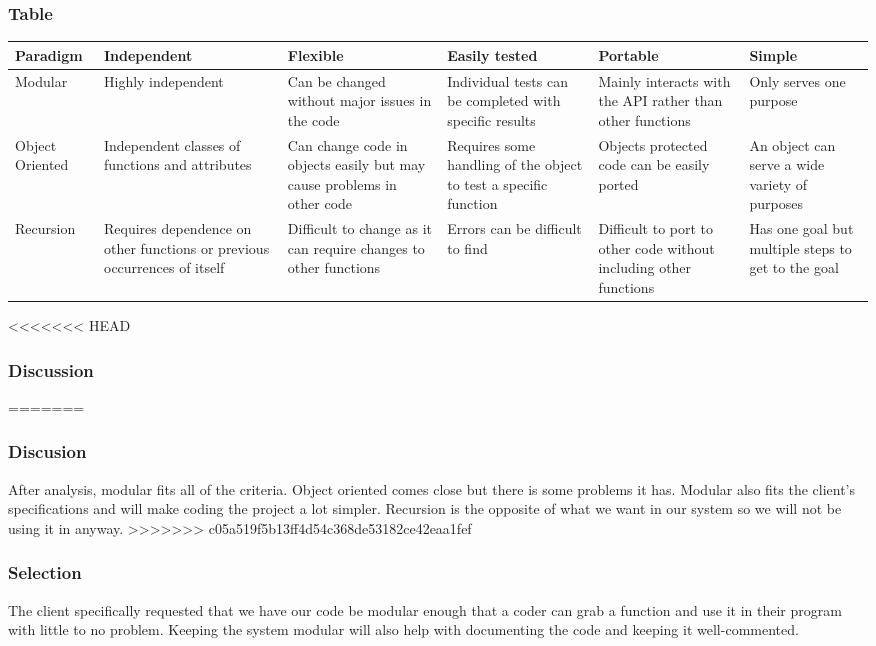 \documentclass[10pt,letterpaper,onecolumn,draftclsnofoot]{IEEEtran}
\begin{document}
\subsubsection{Table}
\begin{center}
\begin{tabular}{ ||B|M|M|M|M|M|| } 
\hline
Paradigm & Independent & Flexible & Easily tested & Portable & Simple \\
 \hline
 Modular & Highly independent & Can be changed without major issues in the code & Individual tests can be completed with specific results & Mainly interacts with the API rather than other functions & Only serves one purpose\\ 
 \hline
 Object Oriented & Independent classes of functions and attributes & Can change code in objects easily but may cause problems in other code & Requires some handling of the object to test a specific function & Objects protected code can be easily ported & An object can serve a wide variety of purposes\\ 
 \hline
 Recursion & Requires dependence on other functions or previous occurrences of itself & Difficult to change as it can require changes to other functions & Errors can be difficult to find  & Difficult to port to other code without including other functions & Has one goal but multiple steps to get to the goal\\ 
 \hline
\end{tabular}
\end{center}

<<<<<<< HEAD
\subsubsection{Discussion}
=======
\subsubsection{Discusion}
After analysis, modular fits all of the criteria. Object oriented comes close but there is some problems it has. Modular also fits the client's specifications and will make coding the project a lot simpler. Recursion is the opposite of what we want in our system so we will not be using it in anyway.
>>>>>>> c05a519f5b13ff4d54c368de53182ce42eaa1fef

\subsubsection{Selection}
The client specifically requested that we have our code be modular enough that a coder can grab a function and use it in their program with little to no problem. Keeping the system modular will also help with documenting the code and keeping it well-commented.
\end{document}
